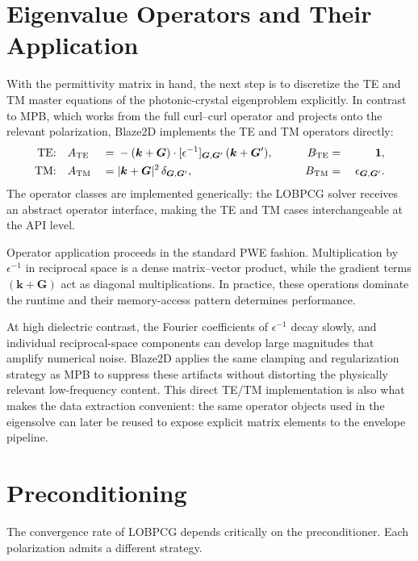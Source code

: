 \section{Eigenvalue Operators and Their Application}\label{sec:operators}

With the permittivity matrix in hand, the next step is to discretize
the TE and TM master equations of the photonic-crystal eigenproblem
explicitly. In contrast to MPB, which works from the full curl--curl
operator and projects onto the relevant polarization, Blaze2D
implements the TE and TM operators directly:
\begin{alignat}{7}
  \text{TE:}\quad & A_{\mathrm{TE}} &{}={}& -(\bm{k} + \bm{G}) \cdot
  [\epsilon^{-1}]_{\bm{G},\bm{G}'}\,(\bm{k} + \bm{G}'),
  \qquad & B_{\mathrm{TE}} &{}={}& \mathbf{1}, \label{eq:op_te}\\
  \text{TM:}\quad & A_{\mathrm{TM}} &{}={}& |\bm{k} + \bm{G}|^{2}\,\delta_{\bm{G},\bm{G}'},
  \qquad & B_{\mathrm{TM}} &{}={}& \epsilon_{\bm{G},\bm{G}'}. \label{eq:op_tm}
\end{alignat}
The operator classes are implemented generically: the LOBPCG solver
receives an abstract operator interface, making the TE and TM cases
interchangeable at the API level.

Operator application proceeds in the standard PWE fashion.
Multiplication by $\epsilon^{-1}$ in reciprocal space is a dense
matrix--vector product, while the gradient terms $(\bm{k} + \bm{G})$
act as diagonal multiplications. In practice, these operations dominate
the runtime and their memory-access pattern determines performance.

At high dielectric contrast, the Fourier coefficients of $\epsilon^{-1}$
decay slowly, and individual reciprocal-space components can develop
large magnitudes that amplify numerical noise. Blaze2D applies the same
clamping and regularization strategy as MPB to suppress these artifacts
without distorting the physically relevant low-frequency content.
This direct TE/TM implementation is also what makes the data extraction
convenient: the same operator objects used in the eigensolve can later
be reused to expose explicit matrix elements to the envelope pipeline.

\section{Preconditioning}\label{sec:preconditioning}

The convergence rate of LOBPCG depends critically on the
preconditioner. Each polarization admits a different strategy.

